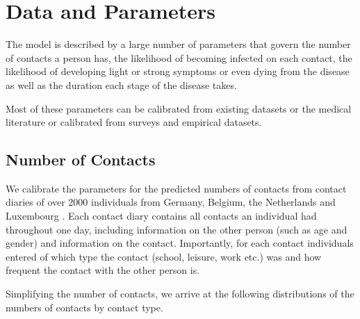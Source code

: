 \section{Data and Parameters}
\label{sec:data_and_parameters}

The model is described by a large number of parameters that govern the number of
contacts a person has, the likelihood of becoming infected on each contact, the
likelihood of developing light or strong symptoms or even dying from the disease as well
as the duration each stage of the disease takes.

Most of these parameters can be calibrated from existing datasets or the medical
literature or calibrated from surveys and empirical datasets.




\subsection{Number of Contacts}
\label{sub:number_of_contacts}

We calibrate the parameters for the predicted numbers of contacts from contact diaries
of over 2000 individuals from Germany, Belgium, the Netherlands and Luxembourg
\citep{Mossong2008}. Each contact diary contains all contacts an individual had
throughout one day, including information on the other person (such as age and gender)
and information on the contact. Importantly, for each contact individuals entered of
which type the contact (school, leisure, work etc.) was and how frequent the contact
with the other person is.

Simplifying the number of contacts, we arrive at the following distributions of the
numbers of contacts by contact type.

